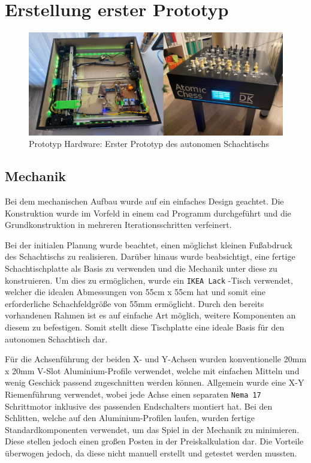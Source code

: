 \hypertarget{erstellung-erster-prototyp}{%
\chapter{Erstellung erster Prototyp}\label{erstellung-erster-prototyp}}

\begin{figure}
\centering
\includegraphics{images/table_images/dk.png}
\caption{Prototyp Hardware: Erster Prototyp des autonomen Schachtischs
\label{dk}}
\end{figure}

\hypertarget{mechanik}{%
\section{Mechanik}\label{mechanik}}

Bei dem mechanischen Aufbau wurde auf ein einfaches Design geachtet. Die
Konstruktion wurde im Vorfeld in einem \gls{cad} Programm durchgeführt
und die Grundkonstruktion in mehreren Iterationsschritten verfeinert.

Bei der initialen Planung wurde beachtet, einen möglichst kleinen
Fußabdruck des Schachtischs zu realisieren. Darüber hinaus wurde
beabsichtigt, eine fertige Schachtischplatte als Basis zu verwenden und
die Mechanik unter diese zu konstruieren. Um dies zu ermöglichen, wurde
ein \passthrough{\lstinline!IKEA Lack!} -Tisch verwendet, welcher die
idealen Abmessungen von 55cm x 55cm hat und somit eine erforderliche
Schachfeldgröße von 55mm ermöglicht. Durch den bereits vorhandenen
Rahmen ist es auf einfache Art möglich, weitere Komponenten an diesem zu
befestigen. Somit stellt diese Tischplatte eine ideale Basis für den
autonomen Schachtisch dar.

Für die Achsenführung der beiden X- und Y-Achsen wurden konventionelle
20mm x 20mm V-Slot Aluminium-Profile verwendet, welche mit einfachen
Mitteln und wenig Geschick passend zugeschnitten werden können.
Allgemein wurde eine X-Y Riemenführung verwendet, wobei jede Achse einen
separaten \passthrough{\lstinline!Nema 17!} Schrittmotor inklusive des
passenden Endschalters montiert hat. Bei den Schlitten, welche auf den
Aluminium-Profilen laufen, wurden fertige Standardkomponenten verwendet,
um das Spiel in der Mechanik zu minimieren. Diese stellen jedoch einen
großen Posten in der Preiskalkulation dar. Die Vorteile überwogen
jedoch, da diese nicht manuell erstellt und getestet werden mussten.

